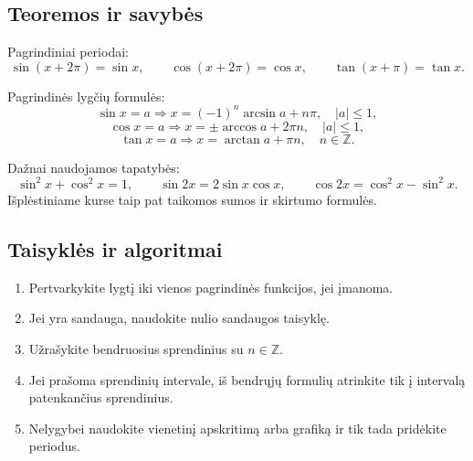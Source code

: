 \subsection{Teoremos ir savybės}
\begin{savybe}
Pagrindiniai periodai:
\[
\sin(x+2\pi)=\sin x,\qquad \cos(x+2\pi)=\cos x,\qquad \tan(x+\pi)=\tan x.
\]
\end{savybe}
\begin{savybe}
Pagrindinės lygčių formulės:
\[
\sin x=a\Rightarrow x=(-1)^n\arcsin a+n\pi,\quad |a|\le1,
\]
\[
\cos x=a\Rightarrow x=\pm\arccos a+2\pi n,\quad |a|\le1,
\]
\[
\tan x=a\Rightarrow x=\arctan a+\pi n,\quad n\in\mathbb{Z}.
\]
\end{savybe}
\begin{savybe}
Dažnai naudojamos tapatybės:
\[
\sin^2x+\cos^2x=1,\qquad
\sin2x=2\sin x\cos x,\qquad
\cos2x=\cos^2x-\sin^2x.
\]
Išplėstiniame kurse taip pat taikomos sumos ir skirtumo formulės.
\end{savybe}

\subsection{Taisyklės ir algoritmai}
\begin{enumerate}[label=\arabic*.]
\item Pertvarkykite lygtį iki vienos pagrindinės funkcijos, jei įmanoma.
\item Jei yra sandauga, naudokite nulio sandaugos taisyklę.
\item Užrašykite bendruosius sprendinius su \(n\in\mathbb{Z}\).
\item Jei prašoma sprendinių intervale, iš bendrųjų formulių atrinkite tik į intervalą patenkančius sprendinius.
\item Nelygybei naudokite vienetinį apskritimą arba grafiką ir tik tada pridėkite periodus.
\end{enumerate}

